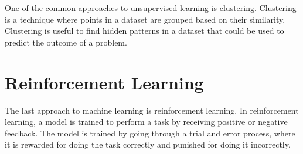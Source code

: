 One of the common approaches to unsupervised learning is clustering. Clustering is a technique where points in a dataset are grouped 
based on their similarity. Clustering is useful to find hidden patterns in a dataset that could be used to predict the outcome
of a problem. \cite{ml_unsupervised_learning}


\section{Reinforcement Learning}\label{ch:reinforcement-learning}
The last approach to machine learning is reinforcement learning. In reinforcement learning, a model is trained to perform a task by
receiving positive or negative feedback. The model is trained by going through a trial and error process, where it is rewarded for doing
the task correctly and punished for doing it incorrectly. \cite{ml_reinforcement_learning} 